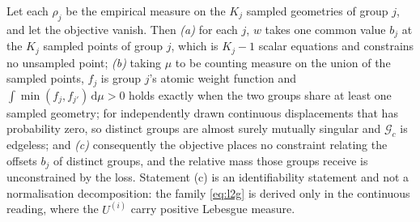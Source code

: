 \begin{corollary}
\label{cor:empirical}
Let each $\rho_j$ be the empirical measure on the $K_j$ sampled geometries of group
$j$, and let the objective vanish. Then \emph{(a)} for each $j$, $w$ takes one
common value $b_j$ at the $K_j$ sampled points of group $j$, which is $K_j - 1$
scalar equations and constrains no unsampled point; \emph{(b)} taking $\mu$ to be
counting measure on the union of the sampled points, $f_j$ is group $j$'s atomic
weight function and $\int \min(f_j,f_{j'})\,\mathrm{d}\mu > 0$ holds exactly when
the two groups share at least one sampled geometry; for independently drawn
continuous displacements that has probability zero, so distinct groups are almost
surely mutually singular and $\mathcal{G}_c$ is edgeless; and \emph{(c)} consequently the objective places no constraint relating
the offsets $b_j$ of distinct groups, and the relative mass those groups receive is
unconstrained by the loss. Statement (c) is an identifiability statement and not a
normalisation decomposition: the family \eqref{eq:l2g} is derived only in the
continuous reading, where the $U^{(i)}$ carry positive Lebesgue measure.
\end{corollary}

